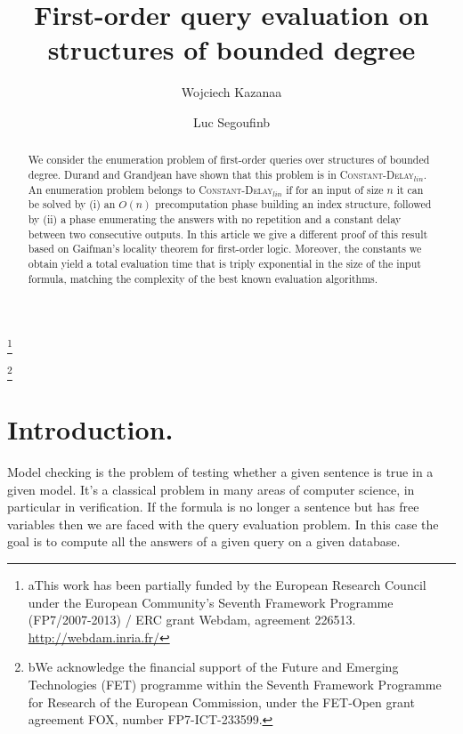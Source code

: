 \documentclass{LMCS}
\newcommand{\CDlin}{{\textsc{Constant-}\textsc{Delay}$_{lin}$}\xspace}
\begin{document}
\title[First-order query evaluation on structures of bounded degree]{First-order query evaluation on structures of bounded degree}

\author[W.~Kazana]{Wojciech Kazana\rsuper a}	\address{{\lsuper a}INRIA and ENS Cachan}	  \thanks{{\lsuper a}This work has been partially funded by the European
  Research Council under the European Community's Seventh Framework
  Programme (FP7/2007-2013) / ERC grant Webdam, agreement
  226513. \url{http://webdam.inria.fr/}}	

\author[L.~Segoufin]{Luc Segoufin\rsuper b} \address{{\lsuper b}INRIA and ENS Cachan}  \thanks{{\lsuper b}We acknowledge the financial support of the Future 
  and Emerging Technologies (FET) programme within the Seventh
  Framework Programme for Research of the European Commission, under
  the FET-Open grant agreement FOX, number FP7-ICT-233599.} 


\begin{abstract}
  We consider the enumeration problem of first-order queries over
  structures of bounded degree. Durand and Grandjean have shown that
  this problem is in \CDlin. An enumeration problem belongs to \CDlin if
  for an input of size $n$ it can be solved by (i) an $O(n)$ precomputation
  phase building an index structure, followed by (ii) a phase enumerating
  the answers with no repetition and a constant delay between two
  consecutive outputs.
  In this article we give a different proof of this result based on
  Gaifman's locality theorem for first-order logic. Moreover, the
  constants we obtain yield a total evaluation time that is triply
  exponential in the size of the input formula, matching the
  complexity of the best known evaluation algorithms.
\end{abstract}

\maketitle

\section{Introduction.}

Model checking is the problem of testing whether a given sentence is true in a
given model. It's a classical problem in many areas of computer science, in
particular in verification.  If the formula is no longer a sentence but has
free variables then we are faced with the query evaluation problem. In this
case the goal is to compute all the answers of a given query on a given
database.
\end{document}
